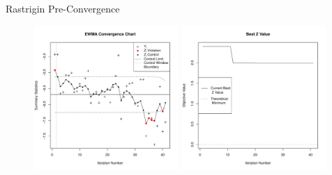 \documentclass[ xcolor = pdftex, dvipsnames, table ]{beamer}
\begin{document}
%
%

\begin{frame}{Rastrigin Pre-Convergence}
\begin{figure}[h!]%
	\includegraphics[width=0.49\textwidth]{ewmaConvChartRastHardStart.pdf}
        \includegraphics[width=0.49\textwidth]{bestZRastHardStart.pdf}
\end{figure}
\end{frame}
\end{document}

